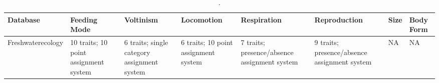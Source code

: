 \begin{table}[H]
    \centering
    \caption{.}
    \label{tab:trait_databases}
    \begin{tabular}{llllllll}
    \toprule
   Database & Feeding Mode & Voltinism & Locomotion & Respiration & Reproduction & Size & Body Form \\ 
    \hline
   Freshwaterecology & 
   10 traits; 10 point assignment system & 
   6 traits; single category assignment system &
   6 traits; 10 point assignment system & 
   7 traits; presence/absence assignment system & 
   9 traits; presence/absence assignment system & 
   NA & 
   NA \\ 
    \hline
    \end{tabular}
\end{table}
